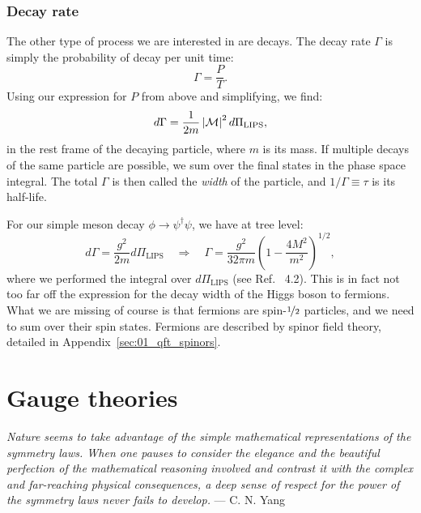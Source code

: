 \subsubsection{Decay rate}

The other type of process we are interested in are decays.
The decay rate $\Gamma$ is simply the probability of decay per unit time:
\begin{equation}
	\label{eq:01_qft_interactions_decay_rate}
	\Gamma =  \frac{P}{T}.
\end{equation}
Using our expression for $P$ from above and simplifying, we find:
\begin{equation}
	\label{eq:01_qft_interactions_differential_decay_rate}
	d\Gamma = \frac{1}{2m} \left\lvert \mathcal M \right\rvert^2 d\Pi_\mathrm{LIPS},
\end{equation}
in the rest frame of the decaying particle, where $m$ is its mass.
If multiple decays of the same particle are possible, we sum over the final states in the phase space integral.
The total $\Gamma$ is then called the \textit{width} of the particle, and $1/\Gamma \equiv \tau$ is its half-life.

For our simple meson decay $\phi \rightarrow \psi^\dagger\psi$, we have at tree level:
\begin{equation}
	\label{eq:01_qft_interactions_decay_rate_meson_decay}
	d\Gamma = \frac{g^2}{2m} d\Pi_\mathrm{LIPS} \quad \Rightarrow \quad \Gamma = \frac{g^2}{32\pi m} \left(1 - \frac{4M^2}{m^2}\right)^{1/2},
\end{equation}
where we performed the integral over $d\Pi_\mathrm{LIPS}$ (see Ref.~\cite{XianyuPSSolutions} 4.2).
This is in fact not too far off the expression for the decay width of the Higgs boson to fermions.
What we are missing of course is that fermions are spin-$\cnicefrac{1}{2}$ particles, and we need to sum over their spin states.
Fermions are described by spinor field theory, detailed in Appendix~\ref{sec:01_qft_spinors}.

\section{Gauge theories}
\label{sec:01_qft_gt}

{
	\noindent
	\textit{Nature seems to take advantage of the simple mathematical representations of the symmetry laws. 
	When one pauses to consider the elegance and the beautiful perfection of the mathematical reasoning involved and contrast it with the complex and far-reaching physical consequences, a deep sense of respect for the power of the symmetry laws never fails to develop.} --- C. N. Yang
}


